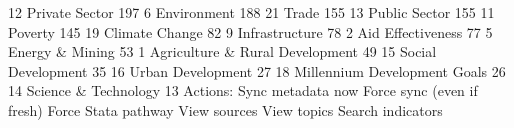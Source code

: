    12    Private Sector                                    197
   6     Environment                                       188
   21    Trade                                             155
   13    Public Sector                                     155
   11    Poverty                                           145
   19    Climate Change                                     82
   9     Infrastructure                                     78
   2     Aid Effectiveness                                  77
   5     Energy \& Mining                                    53
   1     Agriculture \& Rural Development                    49
   15    Social Development                                 35
   16    Urban Development                                  27
   18    Millennium Development Goals                       26
   14    Science \& Technology                               13
{\smallskip}
{\smallskip}
Actions:
{\smallskip}
    Sync metadata now
    Force sync (even if fresh)
    Force Stata pathway
{\smallskip}
    View sources
    View topics
    Search indicators
{\smallskip}
